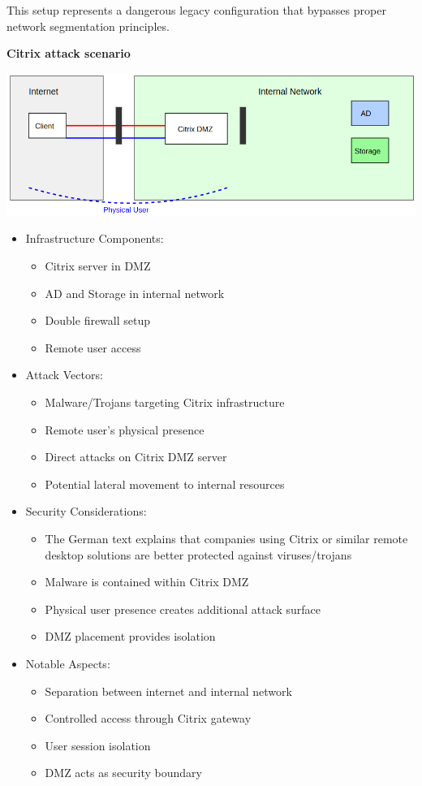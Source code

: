 This setup represents a dangerous legacy configuration that bypasses proper network segmentation principles.

\textbf{Citrix attack scenario}
\begin{center}
    \includegraphics[scale=0.5]{resources/02-citrix-attack-scenario.png}
\end{center}
\begin{itemize}
	\item Infrastructure Components:
    \begin{itemize}
        \tightlist
		\item Citrix server in DMZ
		\item AD and Storage in internal network
		\item Double firewall setup
		\item Remote user access
    \end{itemize}

	\item Attack Vectors:
    \begin{itemize}
        \tightlist
		\item Malware/Trojans targeting Citrix infrastructure
		\item Remote user's physical presence
		\item Direct attacks on Citrix DMZ server
		\item Potential lateral movement to internal resources
    \end{itemize}

	\item Security Considerations:
    \begin{itemize}
        \tightlist
		\item The German text explains that companies using Citrix or similar remote desktop solutions are better protected against viruses/trojans
		\item Malware is contained within Citrix DMZ
		\item Physical user presence creates additional attack surface
		\item DMZ placement provides isolation
    \end{itemize}

	\item Notable Aspects:
    \begin{itemize}
        \tightlist
		\item Separation between internet and internal network
		\item Controlled access through Citrix gateway
		\item User session isolation
		\item DMZ acts as security boundary
    \end{itemize}
\end{itemize}

